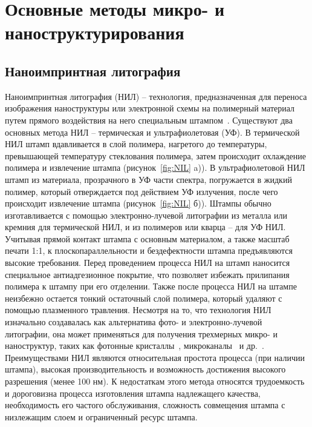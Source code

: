 \section{Основные методы микро- и наноструктурирования}

\subsection{Наноимпринтная литография}
Наноимпринтная литография (НИЛ) -- технология, предназначенная для переноса изображения наноструктуры или электронной схемы на полимерный материал путем прямого воздействия на него специальным штампом~\cite{NIL_1, NIL_2}.
Существуют два основных метода НИЛ -- термическая и ультрафиолетовая (УФ).
В термической НИЛ штамп вдавливается в слой полимера, нагретого до температуры, превышающей температуру стеклования полимера, затем происходит охлаждение полимера и извлечение штампа (рисунок~\ref{fig:NIL} a)).
В ультрафиолетовой НИЛ штамп из материала, прозрачного в УФ части спектра, погружается в жидкий полимер, который отверждается под действием УФ излучения, после чего происходит извлечение штампа (рисунок~\ref{fig:NIL} б)).
Штампы обычно изготавливается с помощью электронно-лучевой литографии из металла или кремния для термической НИЛ, и из полимеров или кварца -- для УФ НИЛ.
Учитывая прямой контакт штампа с основным материалом, а также масштаб печати 1:1, к плоскопараллельности и бездефектности штампа предъявляются высокие требования.
Перед проведением процесса НИЛ на штамп наносится специальное антиадгезионное покрытие, что позволяет избежать прилипания полимера к штампу при его отделении.
Также после процесса НИЛ на штампе неизбежно остается тонкий остаточный слой полимера, который удаляют с помощью плазменного травления.
Несмотря на то, что технология НИЛ изначально создавалась как альтернатива фото- и электронно-лучевой литографии, она может применяться для получения трехмерных микро- и наноструктур, таких как фотонные кристаллы~\cite{NIL_nanophotonics}, микроканалы~\cite{NIL_microfluidics} и \linebreak др.~\cite{NIL_3D_1, NIL_3D_2}.
Преимуществами НИЛ являются относительная простота процесса (при наличии штампа), высокая производительность и возможность достижения высокого разрешения (менее 100 нм).
К недостаткам этого метода относятся трудоемкость и дороговизна процесса изготовления штампа надлежащего качества, необходимость его частого обслуживания, сложность совмещения штампа с низлежащим слоем и ограниченный ресурс штампа.

